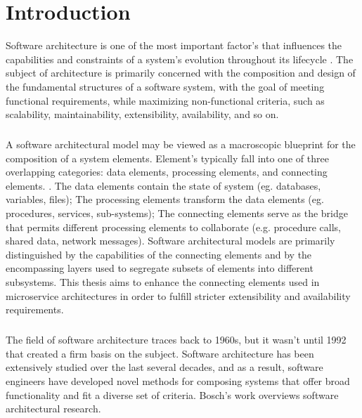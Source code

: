 
%

\chapter{Introduction}
\label{cha:introduction}

Software architecture is one of the most important factor's that influences the capabilities and constraints of a system's evolution throughout its lifecycle \cite{Breivold2012}.
The subject of architecture is primarily concerned with the composition and design of the fundamental structures of a software system,
with the goal of meeting functional requirements, while maximizing non-functional criteria, such as scalability, maintainability, extensibility, availability, and so on.

\paragraph{}

A software architectural model may be viewed as a macroscopic blueprint for the composition of a system elements.
Element's typically fall into one of three overlapping categories: data elements, processing elements, and connecting elements. \cite{architecture}.
The data elements contain the state of system (eg. databases, variables, files);
The processing elements transform the data elements (eg. procedures, services, sub-systems);
The connecting elements serve as the bridge that permits different processing elements to collaborate (e.g. procedure calls, shared data, network messages).
Software architectural models are primarily distinguished by the capabilities of the connecting elements and by the encompassing layers used to segregate subsets of elements into different subsystems.
This thesis aims to enhance the connecting elements used in microservice architectures in order to fulfill stricter extensibility and availability requirements.

\paragraph{}

The field of software architecture traces back to 1960s, but it wasn't until 1992 that \citeauthor{architecture} \cite{architecture} created a firm basis on the subject.
Software architecture has been extensively studied over the last several decades, and as a result,
software engineers have developed novel methods for composing systems that offer broad functionality and fit a diverse set of criteria.
Bosch's work \cite{3, 4} overviews software architectural research.

